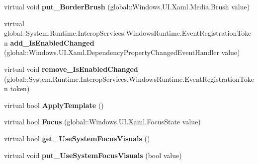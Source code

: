 \begin{DoxyCompactItemize}
\item 
\mbox{\label{class_windows_1_1_u_i_1_1_xaml_1_1_controls_1_1_control_a551a318818f8d5853d61b020af44db11}} 
virtual void {\bfseries put\+\_\+\+Border\+Brush} (global\+::\+Windows.\+U\+I.\+Xaml.\+Media.\+Brush value)
\item 
\mbox{\label{class_windows_1_1_u_i_1_1_xaml_1_1_controls_1_1_control_a825185d5afd2516710efebaeb9350f9d}} 
virtual global\+::\+System.\+Runtime.\+Interop\+Services.\+Windows\+Runtime.\+Event\+Registration\+Token {\bfseries add\+\_\+\+Is\+Enabled\+Changed} (global\+::\+Windows.\+U\+I.\+Xaml.\+Dependency\+Property\+Changed\+Event\+Handler value)
\item 
\mbox{\label{class_windows_1_1_u_i_1_1_xaml_1_1_controls_1_1_control_ae6492dba1a06b7283e52b7e05df6ba01}} 
virtual void {\bfseries remove\+\_\+\+Is\+Enabled\+Changed} (global\+::\+System.\+Runtime.\+Interop\+Services.\+Windows\+Runtime.\+Event\+Registration\+Token token)
\item 
\mbox{\label{class_windows_1_1_u_i_1_1_xaml_1_1_controls_1_1_control_acdc49d1356465906f233a94118f9fc61}} 
virtual bool {\bfseries Apply\+Template} ()
\item 
\mbox{\label{class_windows_1_1_u_i_1_1_xaml_1_1_controls_1_1_control_af09f0101a93f914e3ea713e2afd6cbc5}} 
virtual bool {\bfseries Focus} (global\+::\+Windows.\+U\+I.\+Xaml.\+Focus\+State value)
\item 
\mbox{\label{class_windows_1_1_u_i_1_1_xaml_1_1_controls_1_1_control_a1f599dcf33ab7480ed9700961d478ab9}} 
virtual bool {\bfseries get\+\_\+\+Use\+System\+Focus\+Visuals} ()
\item 
\mbox{\label{class_windows_1_1_u_i_1_1_xaml_1_1_controls_1_1_control_a47ca9e1b055dc27a0c37edbc47e2540d}} 
virtual void {\bfseries put\+\_\+\+Use\+System\+Focus\+Visuals} (bool value)
\item 

\end{DoxyCompactItemize}
